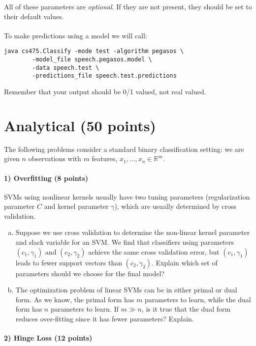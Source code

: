 \documentclass[11pt]{article}
\begin{document}
All of these parameters are \emph{optional}. If they are not present, they should be set to their default values.\\
\\
To make predictions using a model we will call:
\begin{verbatim}
java cs475.Classify -mode test -algorithm pegasos \
        -model_file speech.pegasos.model \
        -data speech.test \
        -predictions_file speech.test.predictions
\end{verbatim}

Remember that your output should be 0/1 valued, not real valued.

\section{Analytical (50 points)}

The following problems consider a standard binary classification setting: we are given $n$ observations with $m$ features, $x_1,...,x_n \in \mathbb{R}^m$.

\paragraph{1) Overfitting (8 points)}
SVMs using nonlinear kernels usually have two tuning parameters (regularization parameter $C$ and kernel parameter $\gamma$), which are usually determined by cross validation. 
\begin{enumerate}[(a)]
\item Suppose we use cross validation to determine the non-linear kernel parameter and slack variable for an SVM. We find that classifiers using parameters $(c_1,\gamma_1)$ and $(c_2,\gamma_2)$ achieve the same cross validation error, but $(c_1,\gamma_1)$ leads to fewer support vectors than $(c_2,\gamma_2)$. Explain which set of parameters should we choose for the final model?
\item The optimization problem of linear SVMs can be in either primal or dual form. As we know, the primal form has $m$ parameters to learn, while the dual form has $n$ parameters to learn. If $m \gg n$, is it true that the dual form reduces over-fitting since it has fewer parameters? Explain.
\end{enumerate}

\paragraph{2) Hinge Loss (12 points)}
\end{document}
